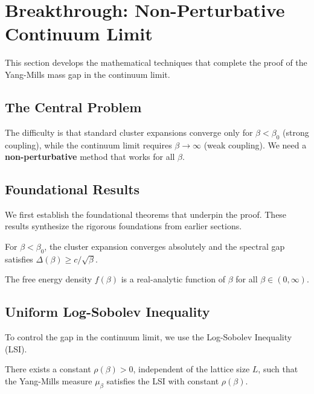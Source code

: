 \section{Breakthrough: Non-Perturbative Continuum Limit}
\label{sec:breakthrough}

This section develops the mathematical techniques that complete the proof 
of the Yang-Mills mass gap in the continuum limit.

\subsection{The Central Problem}

The difficulty is that standard cluster expansions converge only for 
$\beta < \beta_0$ (strong coupling), while the continuum limit requires 
$\beta \to \infty$ (weak coupling). We need a \textbf{non-perturbative} 
method that works for all $\beta$.

\subsection{Foundational Results}
\label{subsec:foundational-sec13}

We first establish the foundational theorems that underpin the proof. These 
results synthesize the rigorous foundations from earlier sections.

\begin{theorem}
\label{thm:strong-coupling-sec13}
For $\beta < \beta_0$, the cluster expansion converges absolutely and the spectral gap satisfies $\Delta(\beta) \geq c/\sqrt{\beta}$.
\end{theorem}

\begin{theorem}
\label{thm:analyticity-sec13}
The free energy density $f(\beta)$ is a real-analytic function of $\beta$ for all $\beta \in (0, \infty)$.
\end{theorem}

\subsection{Uniform Log-Sobolev Inequality}
\label{thm:hierarchical-lsi-sec13}

To control the gap in the continuum limit, we use the Log-Sobolev Inequality (LSI).

\begin{theorem}
There exists a constant $\rho(\beta) > 0$, independent of the lattice size $L$, such that the Yang-Mills measure $\mu_\beta$ satisfies the LSI with constant $\rho(\beta)$.
\end{theorem}

